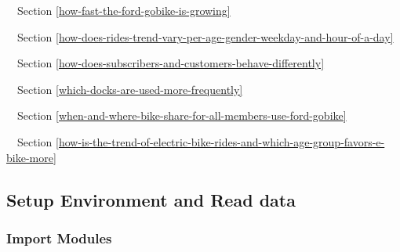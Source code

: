 \documentclass[11pt]{article}
\begin{document}
 Section \ref{how-fast-the-ford-gobike-is-growing}

 Section \ref{how-does-rides-trend-vary-per-age-gender-weekday-and-hour-of-a-day}

 Section \ref{how-does-subscribers-and-customers-behave-differently}

 Section \ref{which-docks-are-used-more-frequently}

 Section \ref{when-and-where-bike-share-for-all-members-use-ford-gobike}

 Section \ref{how-is-the-trend-of-electric-bike-rides-and-which-age-group-favors-e-bike-more}

    \subsection{Setup Environment and Read
data}\label{setup-environment-and-read-data}

    \subsubsection{Import Modules}\label{import-modules}
\end{document}
